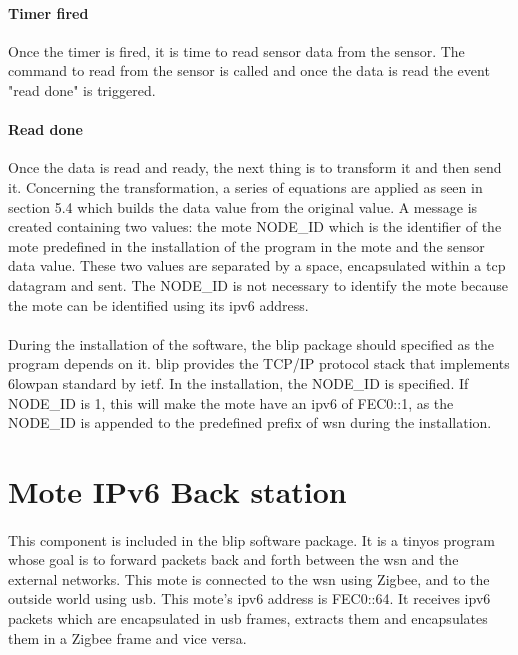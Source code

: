 \documentclass[12pt,a4paper,final]{report}
\begin{document}
\paragraph{Timer fired}
Once the timer is fired, it is time to read sensor data from the sensor. The command to read from the sensor is called and once the data is read the event "read done" is triggered.
\paragraph{Read done}
Once the data is read and ready, the next thing is to transform it and then send it. Concerning the transformation, a series of equations are applied as seen in section 5.4 which builds the data value from the original value. A message is created containing two values: the mote NODE\_ID which is the identifier of the mote predefined in the installation of the program in the mote and the sensor data value. These two values are separated by a space, encapsulated within a \gls{tcp} datagram and sent. The NODE\_ID is not necessary to identify the mote because the mote can be identified using its \gls{ipv6} address.
\paragraph{}
During the installation of the software, the \gls{blip} package should specified as the program depends on it. \gls{blip} provides the TCP/IP protocol stack that implements \gls{6lowpan} standard by \gls{ietf}. In  the installation, the NODE\_ID is specified. If NODE\_ID is 1, this will make the mote have an \gls{ipv6} of FEC0::1, as the NODE\_ID is appended to the predefined prefix of \gls{wsn} during the installation.
\section{Mote IPv6 Back station}
\paragraph{}
This component is included in the \gls{blip} software package. It is a \gls{tinyos} program whose goal is to forward packets back and forth between the \gls{wsn} and the external networks. This mote is connected to the \gls{wsn} using Zigbee, and to the outside world using \gls{usb}. This mote's \gls{ipv6} address is FEC0::64. It receives \gls{ipv6} packets which are encapsulated in \gls{usb} frames, extracts them and encapsulates them in a Zigbee frame and vice versa.
\end{document}
